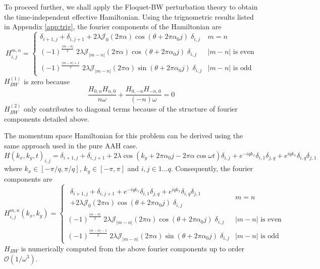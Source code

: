 To proceed further, we shall apply the Floquet-BW perturbation theory to obtain the time-independent effective Hamiltonian.
Using the trignometric results listed in Appendix \ref{app:trig}, the fourier components of the Hamiltonian are
\begin{equation}
 H^{m,n}_{i,j} = \begin{cases}
            \delta_{i+1,j} + \delta_{i,j+1} + 2\lambda \mathcal{J}_{0}(2\pi\alpha) \cos(\theta + 2\pi\alpha_0 j) \;\delta_{i,j} & m=n\\
            (-1)^{\frac{|m-n|}{2}} \;2\lambda \mathcal{J}_{|m-n|}(2\pi\alpha) \cos(\theta + 2\pi\alpha_0 j) \;\delta_{i,j} & |m-n| \text{ is even}\\
            (-1)^{\frac{|m-n|+1}{2}} \;2\lambda \mathcal{J}_{|m-n|}(2\pi\alpha) \sin(\theta + 2\pi\alpha_0 j) \;\delta_{i,j} & |m-n| \text{ is odd}
           \end{cases}
\end{equation}
$H_{BW}^{(1)}$  is zero because
\begin{equation*}
 \frac{H_{0,n}H_{n,0}}{n\omega} + \frac{H_{0,-n}H_{-n,0}}{(-n)\omega} = 0
\end{equation*}
$H_{BW}^{(2)}$ only contributes to diagonal terms because of the structure of fourier components detailed above.

The momentum space Hamiltonian for this problem can be derived using the same approach used in the pure AAH case.
\begin{equation}
 H(k_x, k_y, t)_{i,j} = \delta_{i+1,j} + \delta_{i,j+1} + 2\lambda\cos(k_y + 2\pi\alpha_0 j - 2\pi\alpha \cos{\omega t}) \delta_{i,j} + e^{-iqk_x} \delta_{i,1}\delta_{j,q} + e^{iqk_x} \delta_{i,q}\delta_{j,1}
\end{equation} where $k_x \in [-\pi/q, \pi/q]$, $k_y \in [-\pi,\pi]$ and $i,j \in 1\dots q$.
Consequently, the fourier components are
\begin{equation}
 H^{m,n}_{i,j}(k_x, k_y) = \begin{cases}
            \begin{split}\delta_{i+1,j} + \delta_{i,j+1} + e^{-iqk_x} \delta_{i,1}\delta_{j,q} + e^{iqk_x} \delta_{i,q}\delta_{j,1} \\+ 2\lambda \mathcal{J}_{0}(2\pi\alpha) \cos(\theta + 2\pi\alpha_0 j) \;\delta_{i,j}\end{split} & m=n\\
            (-1)^{\frac{|m-n|}{2}} \;2\lambda \mathcal{J}_{|m-n|}(2\pi\alpha) \cos(\theta + 2\pi\alpha_0 j) \;\delta_{i,j} & |m-n| \text{ is even}\\
            (-1)^{\frac{|m-n|-1}{2}} \;2\lambda \mathcal{J}_{|m-n|}(2\pi\alpha) \sin(\theta + 2\pi\alpha_0 j) \;\delta_{i,j} & |m-n| \text{ is odd}
           \end{cases}
\end{equation}
$H_{BW}$ is numerically computed from the above fourier components up to order $\mathcal{O}(1/\omega^3)$.
